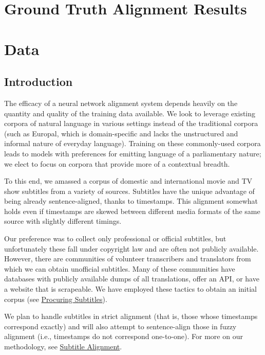 \documentclass[twoside,twocolumn]{article}
\begin{document}
\section{Ground Truth Alignment Results}

\section{Data}



\subsection{Introduction}

The efficacy of a neural network alignment system depends heavily on the
quantity and quality of the training data available. We look to leverage
existing corpora of natural language in various settings instead of the
traditional corpora (such as Europal, which is domain-specific and lacks the
unstructured and informal nature of everyday language). Training on these
commonly-used corpora leads to models with preferences for emitting language
of a parliamentary nature; we elect to focus on corpora that
provide more of a contextual breadth.

To this end, we amassed a corpus of domestic and international movie and TV
show subtitles from a variety of sources. Subtitles have the unique advantage
of being already sentence-aligned, thanks to timestamps. This alignment
somewhat holds even if timestamps are skewed between different media
formats of the same source with slightly different timings.

Our preference was to collect only professional or official subtitles, but
unfortunately these fall under copyright law and are often not publicly
available. However, there are communities of volunteer transcribers and
translators from which we can obtain unofficial subtitles. Many of these
communities have databases with publicly available dumps of all translations,
offer an API, or have a website that is scrapeable. We have employed these
tactics to obtain an initial corpus (see
\hyperref[subsec:procuring-subtitles]{Procuring Subtitles}).

We plan to handle subtitles in strict alignment (that is, those whose timestamps
correspond exactly) and will also attempt to sentence-align those in
fuzzy alignment (i.e., timestamps do not correspond one-to-one). For more on our
methodology, see \hyperref[subsec:subtitle-alignment]{Subtitle Alignment}.
\end{document}
